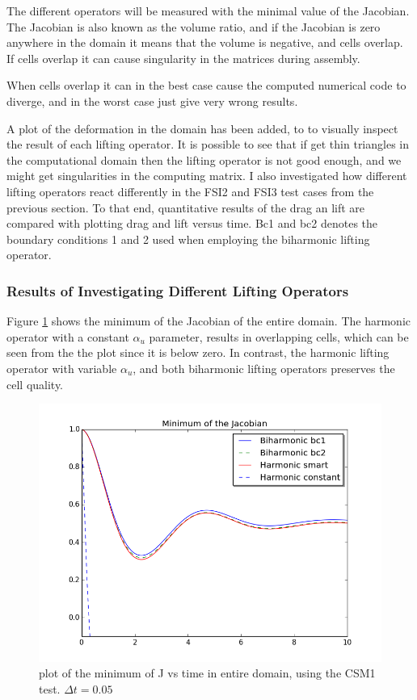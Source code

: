 The different operators will be measured with the minimal value of the Jacobian. The Jacobian is also known as the volume ratio, and if the Jacobian is zero anywhere in the domain it means that the volume is negative, and cells overlap. If cells overlap it can cause singularity in the matrices during assembly. 

When cells overlap it can in the best case cause the computed numerical code to diverge, and in the worst case just give very wrong results. \newline

A plot of the deformation in the domain has been added, to to visually inspect the result of each lifting operator. It is possible to see that if get thin triangles in the computational domain then the lifting operator is not good enough, and we might get singularities in the computing matrix.
I also investigated how different lifting operators react differently in the FSI2 and FSI3 test cases from the previous section. To that end, quantitative results of the drag an lift are compared with plotting drag and lift versus time. Bc1 and bc2 denotes the boundary conditions 1 and 2 used when employing the biharmonic lifting operator.


\subsubsection*{Results of Investigating Different Lifting Operators}
Figure \ref{fig:fluid_structure} shows the minimum of the Jacobian of the entire domain. The harmonic operator with a constant $\alpha_u$ parameter, results in overlapping cells, which can be seen from the the plot since it is below zero. In contrast, the harmonic lifting operator with variable $\alpha_u$, and both biharmonic lifting operators preserves the cell quality.

\begin{figure}[H]
  \label{fig:fluid_structure}
  \includegraphics[scale=0.60, trim={0mm 0mm 0mm 0mm},clip]{./Mesh_motion_results/CSM1.png}
   \caption{plot of the minimum of J vs time in entire domain, using the CSM1 test. $\Delta t = 0.05$}
\end{figure}

